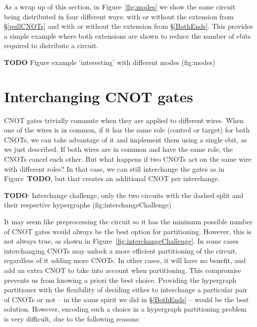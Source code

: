 As a wrap up of this section, in Figure~\ref{fig:modes} we show the same circuit being distributed in four different ways: with or without the extension from \S\ref{pullCNOTs} and with or without the extension from \S\ref{BothEnds}. This provides a simple example where both extensions are shown to reduce the number of ebits required to distribute a circuit.

\textbf{TODO} Figure example `interesting' with different modes (fig:modes)

\section{Interchanging CNOT gates}

CNOT gates trivially commute when they are applied to different wires. When one of the wires is in common, if it has the same role (control or target) for both CNOTs, we can take advantage of it and implement them using a single ebit, as we just described. If both wires are in common and have the same role, the CNOTs cancel each other. But what happens if two CNOTs act on the same wire with different roles? In that case, we can still interchange the gates as in Figure~\textbf{TODO}, but that creates an additional CNOT per interchange.

\textbf{TODO}: Interchange challenge, only the two circuits with the dashed split and their respective hypergraphs (fig:interchangeChallenge)

It may seem like preprocessing the circuit so it has the minimum possible number of CNOT gates would always be the best option for partitioning. However, this is not always true, as shown in Figure~\ref{fig:interchangeChallenge}. In some cases interchanging CNOTs may unlock a more efficient partitioning of the circuit, regardless of it adding more CNOTs. In other cases, it will have no benefit, and add an extra CNOT to take into account when partitioning. This compromise prevents us from knowing a priori the best choice. Providing the hypergraph partitioner with the flexibility of deciding either to interchange a particular pair of CNOTs or not -- in the same spirit we did in \S\ref{BothEnds} -- would be the best solution. However, encoding such a choice in a hypergraph partitioning problem is very difficult, due to the following reasons:

